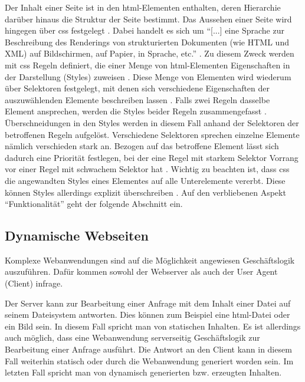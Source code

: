             Der Inhalt einer Seite ist in den \gls{html}-Elementen enthalten,
            deren Hierarchie darüber hinaus die Struktur der Seite bestimmt.
            Das Aussehen einer Seite wird hingegen über \gls{css} festgelegt \cite{w3c:css}.
            Dabei handelt es sich um "`[...] eine Sprache zur Beschreibung des Renderings
            von strukturierten Dokumenten (wie HTML und XML) auf Bildschirmen, auf Papier,
            in Sprache, etc."' \cite{w3c:css}.
            Zu diesem Zweck werden mit \gls{css} Regeln definiert,
            die einer Menge von \gls{html}-Elementen Eigenschaften in der Darstellung (Styles) zuweisen
            \cite{w3c:cssSyntax}.
            Diese Menge von Elementen wird wiederum über Selektoren festgelegt,
            mit denen sich verschiedene Eigenschaften der auszuwählenden Elemente beschreiben lassen
            \cite{w3c:cssSelectors}.
            Falls zwei Regeln dasselbe Element ansprechen,
            werden die Styles beider Regeln zusammengefasst
            \cite{w3c:cssCascading}.
            Überschneidungen in den Styles werden in diesem Fall anhand der Selektoren der betroffenen Regeln aufgelöst.
            Verschiedene Selektoren sprechen einzelne Elemente nämlich verschieden stark an.
            Bezogen auf das betroffene Element lässt sich dadurch eine Priorität festlegen,
            bei der eine Regel mit starkem Selektor Vorrang vor einer Regel mit schwachem Selektor hat
            \cite{w3c:cssSelectors}. 
            Wichtig zu beachten ist, dass \gls{css} die angewandten Styles eines Elementes auf alle Unterelemente vererbt.
            Diese können Styles allerdings explizit überschreiben
            \cite{w3c:cssCascading}.
            Auf den verbliebenen Aspekt "`Funktionalität"' geht der folgende Abschnitt ein.

        \subsection{Dynamische Webseiten}
            Komplexe Webanwendungen sind auf die Möglichkeit angewiesen Geschäftslogik auszuführen.
            Dafür kommen sowohl der Webserver als auch der User Agent (Client) infrage.

            Der Server kann zur Bearbeitung einer Anfrage mit dem Inhalt einer Datei auf seinem Dateisystem antworten.
            Dies können zum Beispiel eine \gls{html}-Datei oder ein Bild sein.
            In diesem Fall spricht man von statischen Inhalten.
            Es ist allerdings auch möglich,
            dass eine Webanwendung serverseitig Geschäftslogik zur Bearbeitung einer Anfrage ausführt.
            Die Antwort an den Client kann in diesem Fall weiterhin statisch oder
            durch die Webanwendung generiert worden sein.
            Im letzten Fall spricht man von dynamisch generierten bzw. erzeugten Inhalten.

